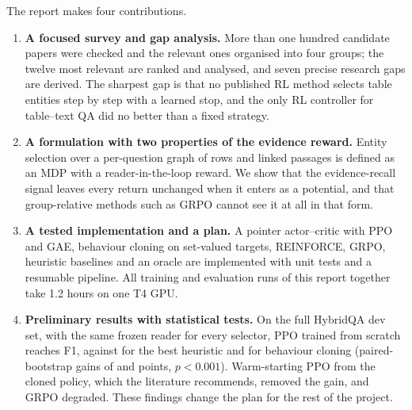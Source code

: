 The report makes four contributions.
\begin{enumerate}
  \item \textbf{A focused survey and gap analysis.} More than one hundred candidate papers were checked and the relevant ones organised into four groups; the twelve most relevant are ranked and analysed, and seven precise research gaps are derived. The sharpest gap is that no published RL method selects table entities step by step with a learned stop, and the only RL controller for table--text QA did no better than a fixed strategy.
  \item \textbf{A formulation with two properties of the evidence reward.} Entity selection over a per-question graph of rows and linked passages is defined as an MDP with a reader-in-the-loop reward. We show that the evidence-recall signal leaves every return unchanged when it enters as a potential, and that group-relative methods such as GRPO cannot see it at all in that form.
  \item \textbf{A tested implementation and a plan.} A pointer actor--critic with PPO and GAE, behaviour cloning on set-valued targets, REINFORCE, GRPO, heuristic baselines and an oracle are implemented with unit tests and a resumable pipeline. All training and evaluation runs of this report together take 1.2 hours on one T4 GPU.
  \item \textbf{Preliminary results with statistical tests.} On the full HybridQA dev set, with the same frozen reader for every selector, PPO trained from scratch reaches \fScratch{} F1, against \fBmThree{} for the best heuristic and \fBc{} for behaviour cloning (paired-bootstrap gains of \dScratchBm{} and \dScratchBc{} points, $p<0.001$). Warm-starting PPO from the cloned policy, which the literature recommends, removed the gain, and GRPO degraded. These findings change the plan for the rest of the project.
\end{enumerate}
